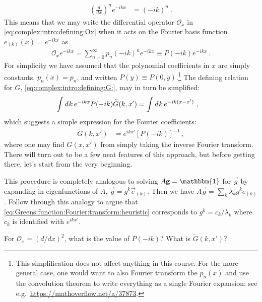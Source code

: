 \begin{align}
	\left(\frac{d}{dx}\right)^n e^{-ikx} &= (-ik)^n \ .
\end{align}
This means that we may write the differential operator $\mathcal O_x$ in \eqref{eq:complex:intro:defining:Ox} when it acts on the Fourier basis function $e_{(k)}(x) = e^{-ikx}$ as
\begin{align}
	\mathcal O_x e^{-ikx} = \sum_{n=0}^{\infty}
	p_n \left(-ik\right)^n e^{-ikx}
	\equiv P(-ik) e^{-ikx}  \ .
\end{align}
For simplicity we have assumed that the polynomial coefficients in $x$ are simply constants, $p_n(x) = p_n$, and written $P(y) \equiv P(0,y)$.\footnote{This simplification does not affect anything in this course. For the more general case, one would want to also Fourier transform the $p_n(x)$ and use the convolution theorem to write everything as a single Fourier expansion; see e.g.~\url{https://mathoverflow.net/a/37873}.}
The defining relation for $G$,
\eqref{eq:complex:intro:defining:G:}, may in turn be simplified:
\begin{align}
	\int \dbar k \, e^{-ikx} P(-ik) \tilde G(k,x') &= \int \dbar k \, e^{-ik(x-x')} \ ,
\end{align}
which suggests a simple expression for the Fourier coefficients:
\begin{align}
	\tilde G(k,x') &= e^{ikx'} \left[P(-ik)\right]^{-1} \ ,
	\label{eq:Greens:function:Fourier:transform:heuristic}
\end{align}
where one may find $G(x,x')$ from simply taking the inverse Fourier transform. There will turn out to be a few neat features of this approach, but before getting there, let's start from the very beginning.

\begin{exercise}
This procedure is completely analogous to solving $A \vec{g} = \mathbbm{1}$ for $\vec{g}$ by expanding in eigenfunctions of $A$, $\vec g = g^k \vec{e}_{(k)}$. Then we have $A\vec{g} = \sum_k \lambda_k g^k e_{(k)}$. Follow through this analogy to argue that \eqref{eq:Greens:function:Fourier:transform:heuristic} corresponds to $g^k = c_k/\lambda_k$ where $c_k$ is identified with $e^{ikx'}$.
\end{exercise}

\begin{exercise}
For $\mathcal O_x = (d/dx)^2$, what is the value of $P(-ik)$? What is $\tilde G(k,x')$?
\end{exercise}



